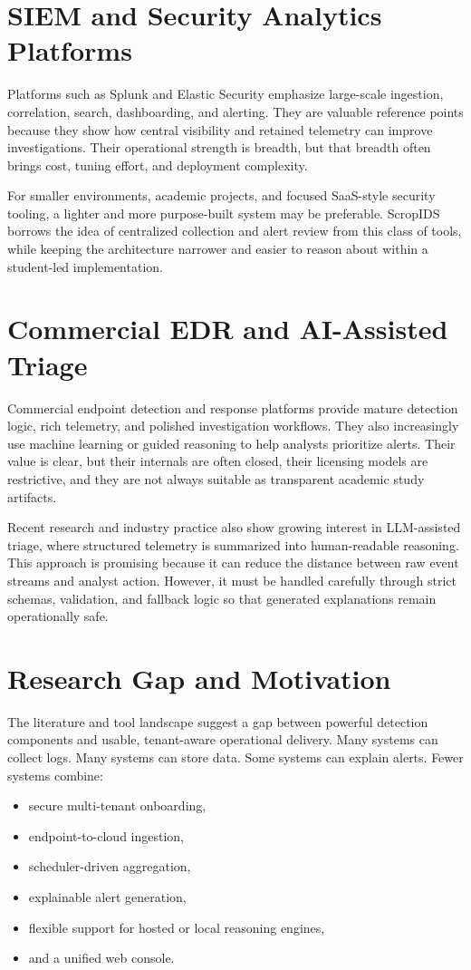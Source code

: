 \documentclass[12pt,a4paper]{report}
\begin{document}
\section{SIEM and Security Analytics Platforms}
Platforms such as Splunk and Elastic Security emphasize large-scale ingestion, correlation, search, dashboarding, and alerting. They are valuable reference points because they show how central visibility and retained telemetry can improve investigations. Their operational strength is breadth, but that breadth often brings cost, tuning effort, and deployment complexity.

For smaller environments, academic projects, and focused SaaS-style security tooling, a lighter and more purpose-built system may be preferable. ScropIDS borrows the idea of centralized collection and alert review from this class of tools, while keeping the architecture narrower and easier to reason about within a student-led implementation.

\section{Commercial EDR and AI-Assisted Triage}
Commercial endpoint detection and response platforms provide mature detection logic, rich telemetry, and polished investigation workflows. They also increasingly use machine learning or guided reasoning to help analysts prioritize alerts. Their value is clear, but their internals are often closed, their licensing models are restrictive, and they are not always suitable as transparent academic study artifacts.

Recent research and industry practice also show growing interest in LLM-assisted triage, where structured telemetry is summarized into human-readable reasoning. This approach is promising because it can reduce the distance between raw event streams and analyst action. However, it must be handled carefully through strict schemas, validation, and fallback logic so that generated explanations remain operationally safe.

\section{Research Gap and Motivation}
The literature and tool landscape suggest a gap between powerful detection components and usable, tenant-aware operational delivery. Many systems can collect logs. Many systems can store data. Some systems can explain alerts. Fewer systems combine:
\begin{itemize}
    \item secure multi-tenant onboarding,
    \item endpoint-to-cloud ingestion,
    \item scheduler-driven aggregation,
    \item explainable alert generation,
    \item flexible support for hosted or local reasoning engines,
    \item and a unified web console.
\end{itemize}
\end{document}
